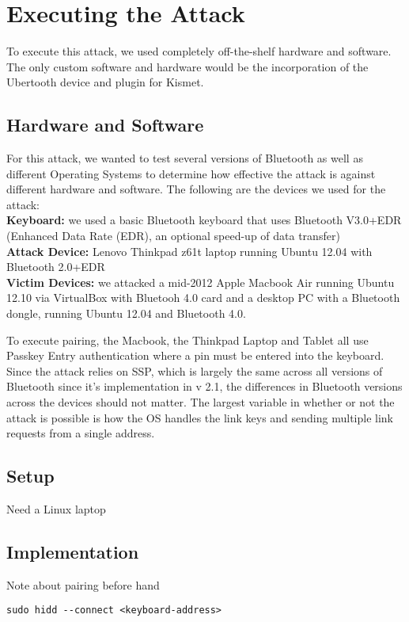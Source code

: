 \documentclass{acm_proc_article-sp}
\begin{document}
\section{Executing the Attack}
To execute this attack, we used completely off-the-shelf hardware and software. The only custom software and hardware would be the incorporation of the Ubertooth device and plugin for Kismet. 


\subsection{Hardware and Software}
For this attack, we wanted to test several versions of Bluetooth as well as different Operating Systems to determine how effective the attack is against different hardware and software. The following are the devices we used for the attack:\\
\textbf{Keyboard:} we used a basic Bluetooth keyboard that uses Bluetooth V3.0+EDR (Enhanced Data Rate (EDR), an optional speed-up of data transfer)\\
\textbf{Attack Device:} Lenovo Thinkpad z61t laptop running Ubuntu 12.04 with Bluetooth 2.0+EDR\\
\textbf{Victim Devices:} we attacked a mid-2012 Apple Macbook Air running Ubuntu 12.10 via VirtualBox with
Bluetooh 4.0 card and a desktop PC with a Bluetooth dongle, running Ubuntu 12.04 and Bluetooth 4.0.

To execute pairing, the Macbook, the Thinkpad Laptop and Tablet all use Passkey Entry authentication where a pin must be entered into the keyboard. Since the attack relies on SSP, which is largely the same across all versions of Bluetooth since it's implementation in v 2.1, the differences in Bluetooth versions across the devices should not matter. The largest variable in whether or not the attack is possible is how the OS handles the link keys and sending multiple link requests from a single address. 

\subsection{Setup}
Need a Linux laptop

\subsection{Implementation}
Note about pairing before hand
\begin{verbatim}
sudo hidd --connect <keyboard-address>
\end{verbatim}
\end{document}
